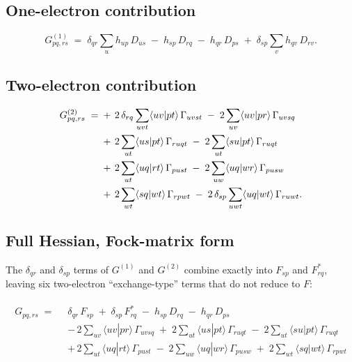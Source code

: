 \documentclass[11pt]{article}
\begin{document}
\subsection*{One-electron contribution}

\begin{equation}
G^{(1)}_{pq,rs} \;=\; \delta_{qr}\sum_{u} h_{up}\,D_{us}
\;-\; h_{sp}\,D_{rq}
\;-\; h_{qr}\,D_{ps}
\;+\; \delta_{sp}\sum_{v} h_{qv}\,D_{rv}.
\end{equation}

\subsection*{Two-electron contribution}

\begin{align}
G^{(2)}_{pq,rs} \;=\;
&+\,2\,\delta_{rq}\sum_{uvt} \langle uv|pt\rangle\,\Gamma_{uvst}
\;-\; 2\sum_{uv} \langle uv|pr\rangle\,\Gamma_{uvsq} \notag\\
&+\,2\sum_{ut} \langle us|pt\rangle\,\Gamma_{ruqt}
\;-\; 2\sum_{ut} \langle su|pt\rangle\,\Gamma_{ruqt} \notag\\
&+\,2\sum_{ut} \langle uq|rt\rangle\,\Gamma_{pust}
\;-\; 2\sum_{uw} \langle uq|wr\rangle\,\Gamma_{pusw} \notag\\
&+\,2\sum_{wt} \langle sq|wt\rangle\,\Gamma_{rpwt}
\;-\; 2\,\delta_{sp}\sum_{uwt} \langle uq|wt\rangle\,\Gamma_{ruwt}.
\end{align}

\subsection*{Full Hessian, Fock-matrix form}

The $\delta_{qr}$ and $\delta_{sp}$ terms of $G^{(1)}$ and $G^{(2)}$ combine exactly into
$F_{sp}$ and $F_{rq}^{*}$, leaving six two-electron ``exchange-type'' terms that do not
reduce to $F$:

\begin{align}
\boxed{
\begin{aligned}
G_{pq,rs} \;=\;\;
& \delta_{qr}\,F_{sp} \;+\; \delta_{sp}\,F_{rq}^{*}
\;-\; h_{sp}\,D_{rq} \;-\; h_{qr}\,D_{ps} \\[4pt]
& -\,2\sum_{uv} \langle uv|pr\rangle\,\Gamma_{uvsq}
\;+\; 2\sum_{ut} \langle us|pt\rangle\,\Gamma_{ruqt}
\;-\; 2\sum_{ut} \langle su|pt\rangle\,\Gamma_{ruqt} \\[4pt]
& +\,2\sum_{ut} \langle uq|rt\rangle\,\Gamma_{pust}
\;-\; 2\sum_{uw} \langle uq|wr\rangle\,\Gamma_{pusw}
\;+\; 2\sum_{wt} \langle sq|wt\rangle\,\Gamma_{rpwt}
\end{aligned}}
\label{eq:g-boxed}
\end{align}
\end{document}
